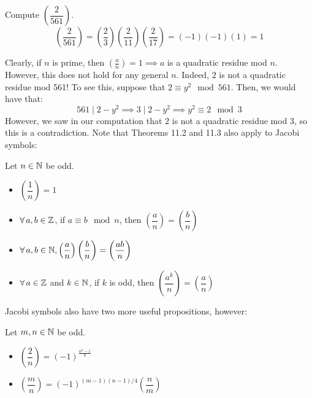 \documentclass{article}
\begin{document}
\begin{xmp}[source=Primary Source Material]
    Compute $ \left( \dfrac{2}{561} \right) $.
    \begin{equation*}
        \left( \frac{2}{561} \right) = \left( \frac{2}{3} \right)
        \left( \frac{2}{11} \right) \left( \frac{2}{17} \right)
        = (-1)(-1)(1) = 1
    \end{equation*}
\end{xmp}

Clearly, if $ n $ is prime, then $ \left( \frac{a}{n} \right) = 1 \implies a $ is a quadratic
residue mod $ n $.
However, this does not hold for any general $ n $. Indeed, $ 2 $ is not a quadratic residue mod
561! To see this, suppose that $ 2 \equiv y^{2} \mod 561 $.
Then, we would have that:
\begin{equation*}
    561 \mid 2 - y^{2} \implies 3 \mid 2 - y^{2} \implies y^{2} \equiv 2 \mod 3
\end{equation*}
However, we saw in our computation that $ 2 $ is not a quadratic residue mod $ 3 $, so this is
a contradiction.
Note that Theorems 11.2 and 11.3 also apply to Jacobi symbols:

\begin{thm}
    Let $ n \in \mathbb{N} $ be odd.
    \begin{itemize}
        \item $ \left( \dfrac{1}{n} \right) = 1 $
        \item $ \forall \,  a, b \in \mathbb{Z} $, if $ a \equiv b \mod n $, then
            $ \left( \dfrac{a}{n} \right) = \left( \dfrac{b}{n} \right) $
        \item $ \forall \, a, b \in \mathbb{N},
            \left( \dfrac{a}{n} \right)\left( \dfrac{b}{n} \right) = \left( \dfrac{ab}{n} \right) $
        \item $ \forall \, a \in \mathbb{Z} $ and $ k \in \mathbb{N} $,
            if $ k $ is odd, then $ \left( \dfrac{a^{k}}{n} \right) = \left( \dfrac{a}{n} \right) $
    \end{itemize}
\end{thm}

Jacobi symbols also have two more useful propositions, however:

\newpage
\begin{thm}
    Let $ m, n \in \mathbb{N} $ be odd.
    \begin{itemize}
        \item $ \left( \dfrac{2}{n} \right) = (-1)^{\frac{n^{2}-1}{8}} $
        \item $ \left( \dfrac{m}{n} \right) = (-1)^{(m-1)(n-1)/4} \left( \dfrac{n}{m} \right) $
    \end{itemize}
\end{thm}
\end{document}
